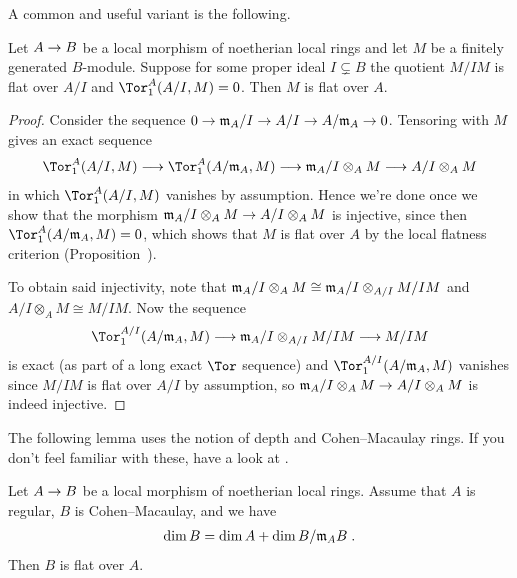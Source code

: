 \documentclass[a4paper,parskip=half,numbers=enddot, DIV=12]{scrreprt}
\begin{document}
A common and useful variant is the following.
\begin{cor}
	Let $A\morphism B$ be a local morphism of noetherian local rings and let $M$ be a finitely generated $B$-module. Suppose for some proper ideal $I\subsetneq B$ the quotient $M/IM$ is flat over $A/I$ and $\Tor_1^A(A/I,M)=0$. Then $M$ is flat over $A$.
\end{cor}
\begin{proof}
	Consider the sequence $0\morphism\mm_A/I\morphism A/I\morphism A/\mm_A\morphism 0$. Tensoring with $M$ gives an exact sequence
	\begin{align*}
		\Tor_1^A(A/I,M)\morphism \Tor_1^A(A/\mm_A,M)\morphism \mm_A/I\otimes_AM\morphism A/I\otimes_AM
	\end{align*}
	in which $\Tor_1^A(A/I,M)$ vanishes by assumption. Hence we're done once we show that the morphism $\mm_A/I\otimes_AM\morphism A/I\otimes_AM$ is injective, since then $\Tor_1^A(A/\mm_A,M)=0$, which shows that $M$ is flat over $A$ by the local flatness criterion (Proposition~).
	
	To obtain said injectivity, note that $\mathfrak{m}_A/I\otimes_AM\cong \mathfrak{m}_A/I\otimes_{A/I}M/IM$ and $A/I\otimes_AM\cong M/IM$. Now the sequence
	\begin{align*}
		\Tor_1^{A/I}(A/\mm_A,M)\morphism \mm_A/I\otimes_{A/I}M/IM\morphism M/IM
	\end{align*}
	is exact (as part of a long exact $\Tor$ sequence) and $\Tor_1^{A/I}(A/\mm_A,M)$ vanishes since $M/IM$ is flat over $A/I$ by assumption, so $\mm_A/I\otimes_AM\morphism A/I\otimes_AM$ is indeed injective.
\end{proof}
The following lemma uses the notion of depth and Cohen--Macaulay rings. If you don't feel familiar with these, have a look at \cite[Section~2.3 and 2.4]{homalg}.
\begin{lem}
	Let $A\morphism B$ be a local morphism of noetherian local rings. Assume that $A$ is regular, $B$ is Cohen--Macaulay, and we have
	\begin{align*}
		\dim B=\dim A+\dim B/\mathfrak{m}_AB\;.
	\end{align*}
	Then $B$ is flat over $A$.
\end{lem}
\end{document}
